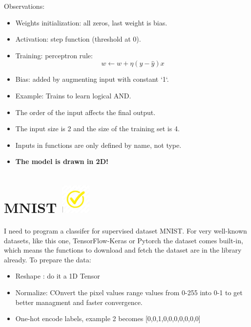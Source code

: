 \documentclass{article}
\begin{document}
Observations:
\begin{itemize}
\item Weights initialization: all zeros, last weight is bias.
\item Activation: step function (threshold at 0).
\item Training: perceptron rule:
  $$  w \gets w + \eta (y - \hat{y})x $$
\item Bias: added by augmenting input with constant `1`.
\item Example: Trains to learn logical AND.
\item The order of the input affects the final output.
\item The input size is 2 and the size of the training set is 4.
\item Inputs in functions are only defined by name, not type.
\item {\bf The model is drawn in 2D!}
\end{itemize}

\section{MNIST \includegraphics[width=2em]{yellow.jpeg} }
I need to program a classifer for supervised dataset MNIST. For very well-known datasets, like this one, TensorFlow-Keras or Pytorch the dataset comes built-in, which means the functions to download and fetch the dataset are in the library already.
 To prepare the data:
\begin{itemize}
    \item Reshape : do it a 1D Tensor
    \item Normalize: COnvert the pixel values range values from 0-255 into 0-1 to get better managment and faster convergence.
    \item One-hot encode labels, example 2 becomes [0,0,1,0,0,0,0,0,0,0]
\end{itemize}
\end{document}
